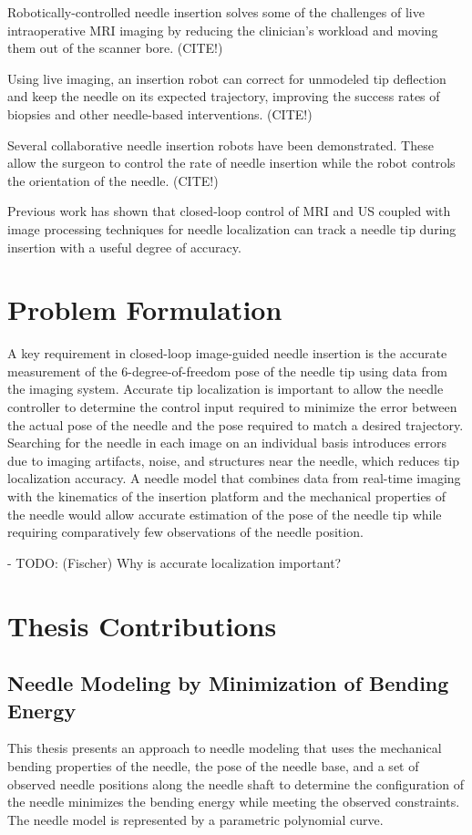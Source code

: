 Robotically-controlled needle insertion solves some of the challenges of live intraoperative MRI imaging by reducing the clinician's workload and moving them out of the scanner bore. (CITE!)

Using live imaging, an insertion robot can correct for unmodeled tip deflection and keep the needle on its expected trajectory, improving the success rates of biopsies and other needle-based interventions. (CITE!)

Several collaborative needle insertion robots have been demonstrated. These allow the surgeon to control the rate of needle insertion while the robot controls the orientation of the needle. (CITE!)

Previous work has shown that closed-loop control of MRI \cite{patel_closed-loop_2015} and US \cite{vrooijink_needle_2014} coupled with image processing techniques for needle localization can track a needle tip during insertion with a useful degree of accuracy.

\section{Problem Formulation}
\label{sec:problem_formulation}
A key requirement in closed-loop image-guided needle insertion is the accurate measurement of the 6-degree-of-freedom pose of the needle tip using data from the imaging system. Accurate tip localization is important to allow the needle controller to determine the control input required to minimize the error between the actual pose of the needle and the pose required to match a desired trajectory. Searching for the needle in each image on an individual basis introduces errors due to imaging artifacts, noise, and structures near the needle, which reduces tip localization accuracy. A needle model that combines data from real-time imaging with the kinematics of the insertion platform and the mechanical properties of the needle would allow accurate estimation of the pose of the needle tip while requiring comparatively few observations of the needle position.

- TODO: (Fischer) Why is accurate localization important?

\section{Thesis Contributions}

\subsection{Needle Modeling by Minimization of Bending Energy}
This thesis presents an approach to needle modeling that uses the mechanical bending properties of the needle, the pose of the needle base, and a set of observed needle positions along the needle shaft to determine the configuration of the needle minimizes the bending energy while meeting the observed constraints. The needle model is represented by a parametric polynomial curve. 

